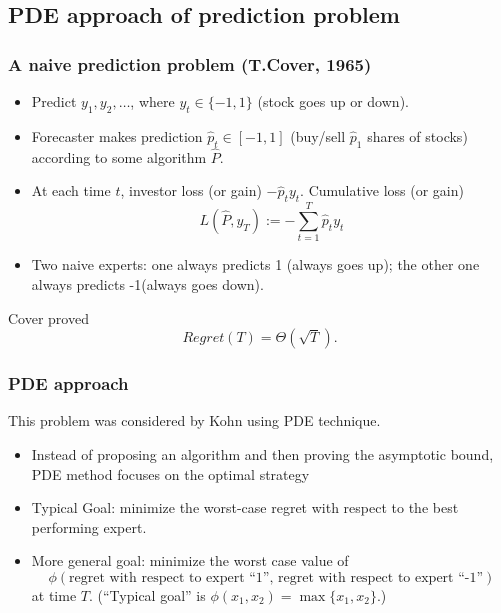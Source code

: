 \documentclass{beamer}
\begin{document}
\subsection{PDE approach of prediction problem}

\begin{frame}
\frametitle{A naive prediction problem (T.Cover, 1965)}
\begin{itemize}
\item Predict $y_1,y_2,\ldots$, where $y_t\in\{-1,1\}$ ({\color{blue}stock goes up or down}). 
\pause
\item Forecaster makes prediction $\hat{p}_t\in[-1,1]$ ({\color{blue}buy/sell $\hat{p}_1$ shares of stocks}) according to some algorithm $\hat{P}$. 
\pause
\item At each time $t$, investor loss (or gain) $-\hat{p}_ty_t$. Cumulative loss (or gain)
$$L(\hat{P},y_T) := -\sum_{t=1}^T\hat{p}_ty_t$$
\pause
\item Two naive experts: one always predicts 1 ({\color{blue}always goes up}); the other one always predicts -1({\color{blue}always goes down}).
\end{itemize}
Cover proved $$Regret(T) = \Theta(\sqrt{T}).$$

\end{frame}

\begin{frame}
\frametitle{PDE approach}
This problem was considered by Kohn using PDE technique.  
\begin{itemize}
\item Instead of proposing an algorithm and then proving the asymptotic bound, PDE method focuses on the optimal strategy
\pause
\item Typical Goal: minimize the worst-case regret with respect to the best performing expert.
\pause
\item More general goal: minimize the worst case value of 
$$\phi(\text{regret with respect to expert ``1'', regret with respect to expert ``-1''})$$
at time $T$. (``Typical goal'' is $\phi(x_1,x_2) = \max\{x_1,x_2\}$.)
\end{itemize}


\end{frame}
\end{document}
